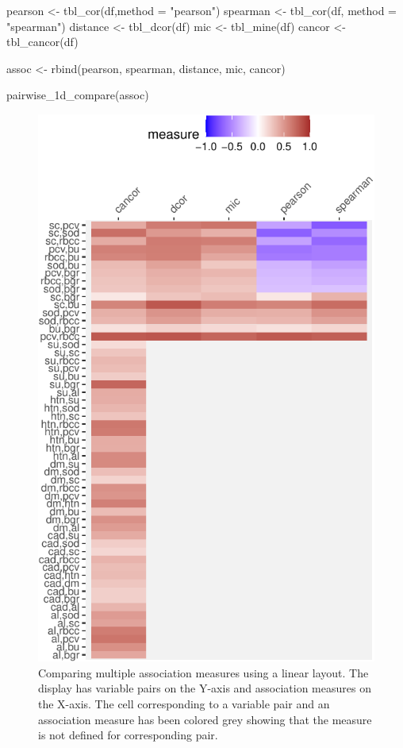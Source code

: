\begin{Schunk}
\begin{Sinput}
pearson <- tbl_cor(df,method = "pearson")
spearman <- tbl_cor(df, method = "spearman")
distance <- tbl_dcor(df)
mic <- tbl_mine(df)
cancor <- tbl_cancor(df)

assoc <- rbind(pearson, spearman, distance, mic, cancor)

pairwise_1d_compare(assoc)
\end{Sinput}
\begin{figure}

{\centering \includegraphics{rj_paper_files/figure-latex/compare-linear-1} 

}

\caption[Comparing multiple association measures using a linear layout]{Comparing multiple association measures using a linear layout. The display has variable pairs on the Y-axis and association measures on the X-axis. The cell corresponding to a variable pair and an association measure has been colored grey showing that the measure is not defined for corresponding pair.}\label{fig:compare-linear}
\end{figure}
\end{Schunk}

